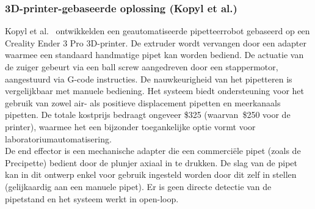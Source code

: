 \subsubsection{3D-printer-gebaseerde oplossing (Kopyl et al.)} 
Kopyl et al.\ \cite{RN42} ontwikkelden een geautomatiseerde pipetteerrobot gebaseerd op een Creality Ender 3 Pro 3D-printer. De extruder wordt vervangen door een adapter waarmee een standaard handmatige pipet kan worden bediend. De actuatie van de zuiger gebeurt via een ball screw aangedreven door een stappermotor, aangestuurd via G-code instructies. De nauwkeurigheid van het pipetteren is vergelijkbaar met manuele bediening. Het systeem biedt ondersteuning voor het gebruik van zowel air- als positieve displacement pipetten en meerkanaals pipetten. De totale kostprijs bedraagt ongeveer \$325 (waarvan\ \$250 voor de printer), waarmee het een bijzonder toegankelijke optie vormt voor laboratoriumautomatisering.
\\[12pt]De end effector is een mechanische adapter die een commerciële pipet (zoals de Precipette) bedient door de plunjer axiaal in te drukken. De slag van de pipet kan in dit ontwerp enkel voor gebruik ingesteld worden door dit zelf in stellen (gelijkaardig aan een manuele pipet). Er is geen directe detectie van de pipetstand en het systeem werkt in open-loop.

